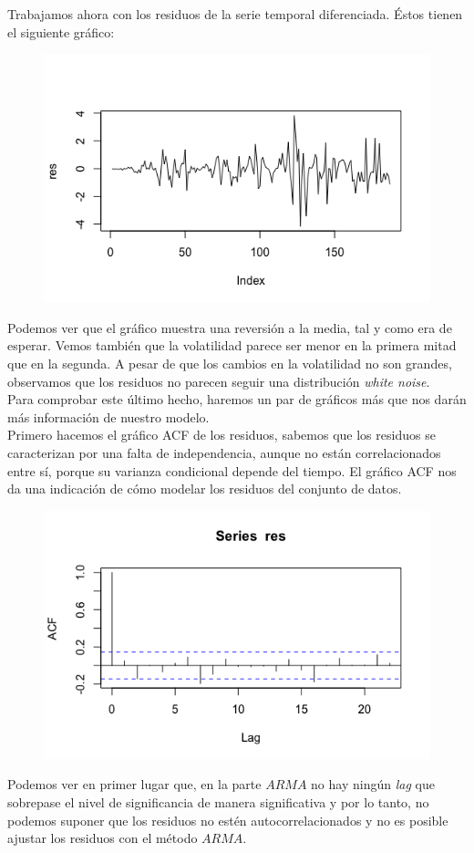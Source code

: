 \documentclass[a4paper,]{article}
\begin{document}
Trabajamos ahora con los residuos de la serie temporal diferenciada. Éstos tienen el siguiente gráfico:
\begin{figure}[H]
    \centering
\includegraphics[width=0.5\linewidth]{1c.png}
\end{figure}
Podemos ver que el gráfico muestra una reversión a la media, tal y como era de esperar. Vemos también que la volatilidad parece ser menor en la primera mitad que en la segunda. A pesar de que los cambios en la volatilidad no son grandes, observamos que los residuos no parecen seguir una distribución \textit{white noise}.\\

Para comprobar este último hecho, haremos un par de gráficos más que nos darán más información de nuestro modelo. \\

Primero hacemos el gráfico ACF de los residuos, sabemos que los residuos se caracterizan por una falta de independencia, aunque no están correlacionados entre sí, porque su varianza condicional depende del tiempo. El gráfico ACF nos da una indicación de cómo modelar los residuos del conjunto de datos.
\begin{figure}[H]
    \centering
\includegraphics[width=0.5\linewidth]{1cacfres.png}
\end{figure}
Podemos ver en primer lugar que, en la parte $ARMA$ no hay ningún \textit{lag} que sobrepase el nivel de significancia de manera significativa y por lo tanto, no podemos suponer que los residuos no estén autocorrelacionados y no es posible ajustar los residuos con el método $ARMA$. \\
\end{document}
